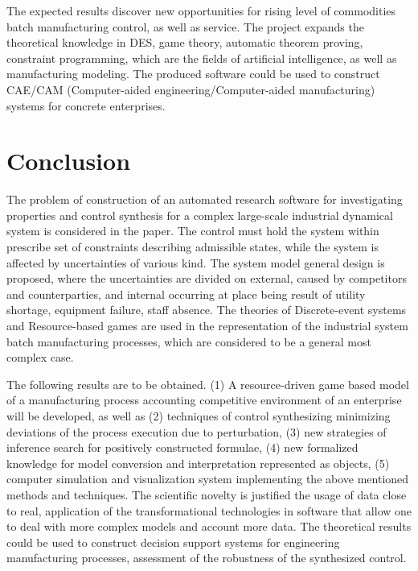 \documentclass[conference]{IEEEtran}
\begin{document}
The expected results discover new opportunities for rising level of commodities batch manufacturing control, as well as service. The project expands the theoretical knowledge in DES, game theory, automatic theorem proving, constraint programming, which are the fields of artificial intelligence, as well as manufacturing modeling. The produced software could be used to construct CAE/CAM (Computer-aided engineering/Computer-aided manufacturing) systems for concrete enterprises.

\section*{Conclusion}
\label{sec:conc}

The problem of construction of an automated research software for investigating properties and control synthesis for a complex large-scale industrial dynamical system is considered in the paper.  The control must hold the system within prescribe set of constraints describing admissible states, while the system is affected by uncertainties of various kind.  The system model general design is proposed, where the uncertainties are divided on external, caused by competitors and counterparties, and internal occurring at place being result of utility shortage, equipment failure, staff absence.  The theories of Discrete-event systems and Resource-based games are used in the representation of the industrial system batch manufacturing processes, which are considered to be a general most complex case.

The following results are to be obtained. (1) A resource-driven game based model of a manufacturing process accounting competitive environment of an enterprise will be developed, as well as (2) techniques of control synthesizing minimizing deviations of the process execution due to perturbation, (3) new strategies of inference search for positively constructed formulae, (4) new formalized knowledge for model conversion and interpretation represented as objects, (5) computer simulation and visualization system implementing the above mentioned methods and techniques. The scientific novelty is justified the usage of data close to real, application of the transformational technologies in software that allow one to deal with more complex models and account more data. The theoretical results could be used to construct decision support systems for engineering manufacturing processes, assessment of the robustness of the synthesized control.
\end{document}
